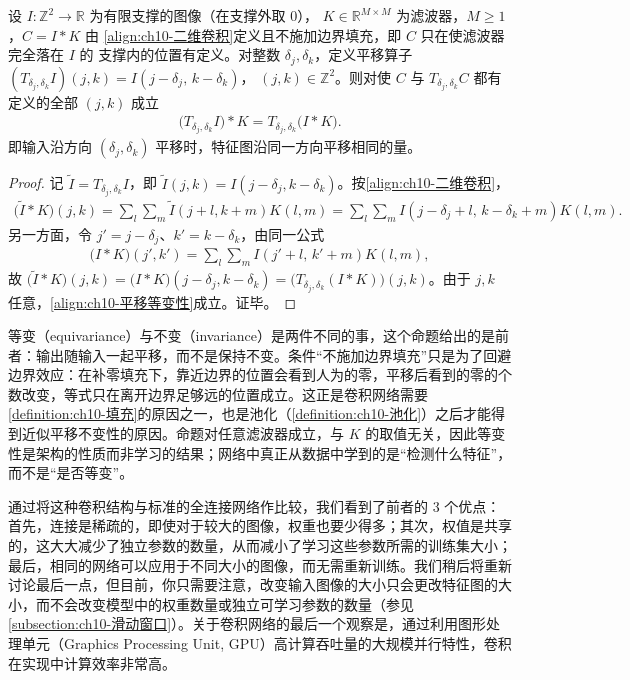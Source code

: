 \documentclass[../../main.tex]{subfiles}
\begin{document}
\begin{proposition}[卷积的平移等变性]\label{proposition:ch10-平移等变性}
设 $I:\mathbb{Z}^{2}\to\mathbb{R}$ 为有限支撑的图像（在支撑外取 $0$），
$K\in\mathbb{R}^{M\times M}$ 为滤波器，$M\geqslant1$，$C=I*K$ 由
\eqref{align:ch10-二维卷积}定义且不施加边界填充，即 $C$ 只在使滤波器完全落在 $I$ 的
支撑内的位置有定义。对整数 $\delta_j,\delta_k$，定义平移算子
$(T_{\delta_j,\delta_k}I)(j,k)=I(j-\delta_j,\,k-\delta_k)$，
$(j,k)\in\mathbb{Z}^{2}$。则对使 $C$ 与 $T_{\delta_j,\delta_k}C$ 都有定义的全部
$(j,k)$ 成立
\begin{align}
  \bigl(T_{\delta_j,\delta_k}I\bigr)*K = T_{\delta_j,\delta_k}\bigl(I*K\bigr).
  \label{align:ch10-平移等变性}
\end{align}
即输入沿方向 $(\delta_j,\delta_k)$ 平移时，特征图沿同一方向平移相同的量。
\end{proposition}
\begin{proof}
记 $\tilde{I}=T_{\delta_j,\delta_k}I$，即 $\tilde{I}(j,k)=I(j-\delta_j,k-\delta_k)$。按\eqref{align:ch10-二维卷积}，
\begin{align*}
  \bigl(\tilde{I}*K\bigr)(j,k)=\sum_{l}\sum_{m}\tilde{I}(j+l,k+m)K(l,m)
  =\sum_{l}\sum_{m}I(j-\delta_j+l,\,k-\delta_k+m)K(l,m).
\end{align*}
另一方面，令 $j'=j-\delta_j$、$k'=k-\delta_k$，由同一公式
\begin{align*}
  \bigl(I*K\bigr)(j',k')=\sum_{l}\sum_{m}I(j'+l,\,k'+m)K(l,m),
\end{align*}
故 $\bigl(\tilde{I}*K\bigr)(j,k)=\bigl(I*K\bigr)(j-\delta_j,k-\delta_k)=\bigl(T_{\delta_j,\delta_k}(I*K)\bigr)(j,k)$。由于 $j,k$ 任意，\eqref{align:ch10-平移等变性}成立。证毕。
\end{proof}

\begin{remark}
等变（equivariance）与不变（invariance）是两件不同的事，这个命题给出的是前者：输出随输入一起平移，而不是保持不变。条件“不施加边界填充”只是为了回避边界效应：在补零填充下，靠近边界的位置会看到人为的零，平移后看到的零的个数改变，等式只在离开边界足够远的位置成立。这正是卷积网络需要\cref{definition:ch10-填充}的原因之一，也是池化（\cref{definition:ch10-池化}）之后才能得到近似平移不变性的原因。命题对任意滤波器成立，与 $K$ 的取值无关，因此等变性是架构的性质而非学习的结果；网络中真正从数据中学到的是“检测什么特征”，而不是“是否等变”。
\end{remark}

通过将这种卷积结构与标准的全连接网络作比较，我们看到了前者的 3 个优点：首先，连接是稀疏的，即使对于较大的图像，权重也要少得多；其次，权值是共享的，这大大减少了独立参数的数量，从而减小了学习这些参数所需的训练集大小；最后，相同的网络可以应用于不同大小的图像，而无需重新训练。我们稍后将重新讨论最后一点，但目前，你只需要注意，改变输入图像的大小只会更改特征图的大小，而不会改变模型中的权重数量或独立可学习参数的数量（参见\cref{subsection:ch10-滑动窗口}）。关于卷积网络的最后一个观察是，通过利用图形处理单元（Graphics Processing Unit, GPU）高计算吞吐量的大规模并行特性，卷积在实现中计算效率非常高。
\end{document}
